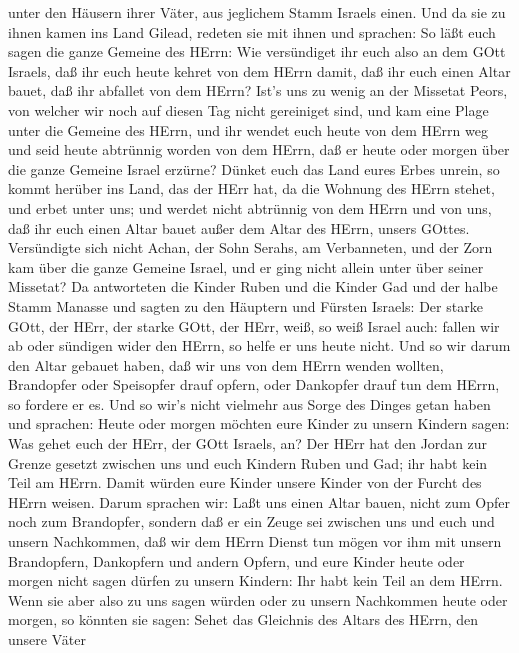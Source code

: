 unter den Häusern ihrer Väter, aus jeglichem Stamm Israels einen.
 Und da sie zu ihnen kamen ins Land Gilead, redeten sie mit
ihnen und sprachen:  So läßt euch sagen die ganze Gemeine
des HErrn: Wie versündiget ihr euch also an dem GOtt Israels, daß ihr
euch heute kehret von dem HErrn damit, daß ihr euch einen Altar bauet,
daß ihr abfallet von dem HErrn?  Ist's uns zu wenig an der
Missetat Peors, von welcher wir noch auf diesen Tag nicht gereiniget
sind, und kam eine Plage unter die Gemeine des HErrn,  und
ihr wendet euch heute von dem HErrn weg und seid heute abtrünnig worden
von dem HErrn, daß er heute oder morgen über die ganze Gemeine Israel
erzürne?  Dünket euch das Land eures Erbes unrein, so kommt
herüber ins Land, das der HErr hat, da die Wohnung des HErrn stehet, und
erbet unter uns; und werdet nicht abtrünnig von dem HErrn und von uns,
daß ihr euch einen Altar bauet außer dem Altar des HErrn, unsers GOttes.
 Versündigte sich nicht Achan, der Sohn Serahs, am
Verbanneten, und der Zorn kam über die ganze Gemeine Israel, und er ging
nicht allein unter über seiner Missetat?  Da antworteten
die Kinder Ruben und die Kinder Gad und der halbe Stamm Manasse und
sagten zu den Häuptern und Fürsten Israels:  Der starke
GOtt, der HErr, der starke GOtt, der HErr, weiß, so weiß Israel auch:
fallen wir ab oder sündigen wider den HErrn, so helfe er uns heute
nicht.  Und so wir darum den Altar gebauet haben, daß wir
uns von dem HErrn wenden wollten, Brandopfer oder Speisopfer drauf
opfern, oder Dankopfer drauf tun dem HErrn, so fordere er es.
 Und so wir's nicht vielmehr aus Sorge des Dinges getan
haben und sprachen: Heute oder morgen möchten eure Kinder zu unsern
Kindern sagen: Was gehet euch der HErr, der GOtt Israels, an?
 Der HErr hat den Jordan zur Grenze gesetzt zwischen uns
und euch Kindern Ruben und Gad; ihr habt kein Teil am HErrn. Damit
würden eure Kinder unsere Kinder von der Furcht des HErrn weisen.
 Darum sprachen wir: Laßt uns einen Altar bauen, nicht zum
Opfer noch zum Brandopfer,  sondern daß er ein Zeuge sei
zwischen uns und euch und unsern Nachkommen, daß wir dem HErrn Dienst
tun mögen vor ihm mit unsern Brandopfern, Dankopfern und andern Opfern,
und eure Kinder heute oder morgen nicht sagen dürfen zu unsern Kindern:
Ihr habt kein Teil an dem HErrn.  Wenn sie aber also zu uns
sagen würden oder zu unsern Nachkommen heute oder morgen, so könnten sie
sagen: Sehet das Gleichnis des Altars des HErrn, den unsere Väter
